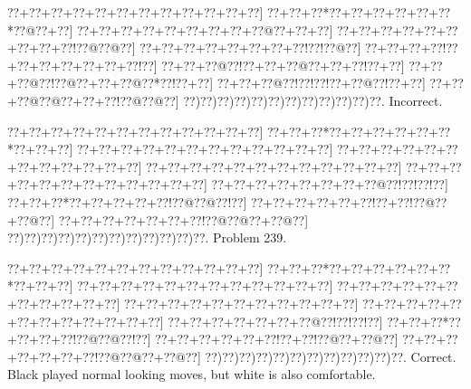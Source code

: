 \documentclass[a5paper]{article}
\begin{document}
\begin{center}
{\goo
\0??+\0??+\0??+\0??+\0??+\0??+\0??+\0??+\0??+\0??+\0??+\0??]
\0??+\0??+\0??*\0??+\0??+\0??+\0??+\0??+\0??*\0??@\0??+\0??]
\0??+\0??+\0??+\0??+\0??+\0??+\0??+\0??+\0??@\0??+\0??+\0??]
\0??+\0??+\0??+\0??+\0??+\0??+\0??+\0??+\0??!\0??@\0??@\0??]
\0??+\0??+\0??+\0??+\0??+\0??+\0??+\0??!\0??!\0??@\0??]
\0??+\0??+\0??+\0??!\0??+\0??+\0??+\0??+\0??+\0??+\0??!\0??]
\0??+\0??+\0??@\0??!\0??+\0??+\0??@\0??+\0??+\0??!\0??+\0??]
\0??+\0??+\0??@\0??!\0??@\0??+\0??+\0??@\0??*\0??!\0??+\0??]
\0??+\0??+\0??@\0??!\0??!\0??!\0??+\0??@\0??!\0??+\0??]
\0??+\0??+\0??@\0??@\0??+\0??+\0??!\0??@\0??@\0??]
\0??)\0??)\0??)\0??)\0??)\0??)\0??)\0??)\0??)\0??)\0??)\0??.
}
Incorrect. 

\end{center}
\newpage
\begin{center}
{\goo
\0??+\0??+\0??+\0??+\0??+\0??+\0??+\0??+\0??+\0??+\0??+\0??]
\0??+\0??+\0??*\0??+\0??+\0??+\0??+\0??+\0??*\0??+\0??+\0??]
\0??+\0??+\0??+\0??+\0??+\0??+\0??+\0??+\0??+\0??+\0??+\0??]
\0??+\0??+\0??+\0??+\0??+\0??+\0??+\0??+\0??+\0??+\0??+\0??]
\0??+\0??+\0??+\0??+\0??+\0??+\0??+\0??+\0??+\0??+\0??+\0??]
\0??+\0??+\0??+\0??+\0??+\0??+\0??+\0??+\0??+\0??+\0??+\0??]
\0??+\0??+\0??+\0??+\0??+\0??+\0??+\0??@\0??!\0??!\0??!\0??]
\0??+\0??+\0??*\0??+\0??+\0??+\0??+\0??!\0??@\0??@\0??!\0??]
\0??+\0??+\0??+\0??+\0??+\0??!\0??+\0??!\0??@\0??+\0??@\0??]
\0??+\0??+\0??+\0??+\0??+\0??+\0??!\0??@\0??@\0??+\0??@\0??]
\0??)\0??)\0??)\0??)\0??)\0??)\0??)\0??)\0??)\0??)\0??)\0??.
}
Problem 239.

\end{center}
\begin{center}
{\goo
\0??+\0??+\0??+\0??+\0??+\0??+\0??+\0??+\0??+\0??+\0??+\0??]
\0??+\0??+\0??*\0??+\0??+\0??+\0??+\0??+\0??*\0??+\0??+\0??]
\0??+\0??+\0??+\0??+\0??+\0??+\0??+\0??+\0??+\0??+\0??+\0??]
\0??+\0??+\0??+\0??+\0??+\0??+\0??+\0??+\0??+\0??+\0??]
\0??+\0??+\0??+\0??+\0??+\0??+\0??+\0??+\0??+\0??+\0??]
\0??+\0??+\0??+\0??+\0??+\0??+\0??+\0??+\0??+\0??+\0??+\0??]
\0??+\0??+\0??+\0??+\0??+\0??+\0??@\0??!\0??!\0??!\0??]
\0??+\0??+\0??*\0??+\0??+\0??+\0??!\0??@\0??@\0??!\0??]
\0??+\0??+\0??+\0??+\0??+\0??!\0??+\0??!\0??@\0??+\0??@\0??]
\0??+\0??+\0??+\0??+\0??+\0??+\0??!\0??@\0??@\0??+\0??@\0??]
\0??)\0??)\0??)\0??)\0??)\0??)\0??)\0??)\0??)\0??)\0??)\0??.
}
Correct. Black played normal looking moves, but white is also comfortable.

\end{center}
\end{document}

